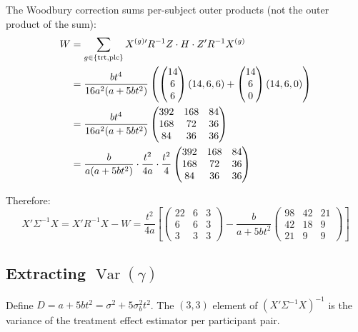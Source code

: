 \documentclass[11pt]{article}
\DeclareMathOperator{\Var}{Var}
\begin{document}
The Woodbury correction sums per-subject outer products
(not the outer product of the sum):
\begin{align}
  W &= \sum_{g \in \{\text{trt},\text{plc}\}}
    X^{(g)\prime} R^{-1}Z \cdot H \cdot Z'R^{-1} X^{(g)}
    \notag \\
  &= \frac{bt^4}{16a^2(a+5bt^2)}\left(
    \begin{pmatrix} 14\\6\\6 \end{pmatrix}(14,6,6)
    + \begin{pmatrix} 14\\6\\0 \end{pmatrix}(14,6,0)
  \right) \notag \\
  &= \frac{bt^4}{16a^2(a+5bt^2)}\begin{pmatrix}
    392 & 168 & 84 \\
    168 & 72 & 36 \\
    84 & 36 & 36
  \end{pmatrix}
  \notag \\
  &= \frac{b}{a(a+5bt^2)} \cdot \frac{t^2}{4a}
    \cdot \frac{t^2}{4}\begin{pmatrix}
    392 & 168 & 84 \\
    168 & 72 & 36 \\
    84 & 36 & 36
  \end{pmatrix}
\end{align}

Therefore:
\begin{equation}
  X'\Sigma^{-1}X = X'R^{-1}X - W
  = \frac{t^2}{4a}\left[
    \begin{pmatrix}
      22 & 6 & 3 \\ 6 & 6 & 3 \\ 3 & 3 & 3
    \end{pmatrix}
    - \frac{b}{a+5bt^2}
    \begin{pmatrix}
      98 & 42 & 21 \\ 42 & 18 & 9 \\ 21 & 9 & 9
    \end{pmatrix}
  \right]
  \label{eq:XSigmaX}
\end{equation}


\subsection{Extracting $\Var(\hat\gamma)$}

Define $D = a + 5bt^2 = \sigma^2 + 5\sigma_b^2 t^2$. The
$(3,3)$ element of $(X'\Sigma^{-1}X)^{-1}$ is the variance
of the treatment effect estimator per participant pair.
\end{document}
